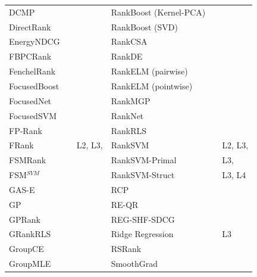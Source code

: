 \documentclass{sig-alternate}
\begin{document}
\begin{table}[!hpt]
{\begin{tabular}{lll|lll}
DCMP & \cite{Renjifo2012}  & \cite{Renjifo2012}  & RankBoost (Kernel-PCA) & \cite{Duh2008} & \cite{Duh2008, Sato2013} \\
DirectRank & \cite{Tan2013} & \cite{Tan2013} & RankBoost (SVD) & \cite{Lin2009} & \cite{Lin2009} \\
EnergyNDCG & \cite{Freno2011} & \cite{Freno2011} & RankCSA & \cite{He2010} & \cite{He2010} \\
FBPCRank & \cite{Lai2011} & \cite{Lai2011} & RankDE & \cite{Bollegala2011} & \cite{Sato2013} \\
FenchelRank & \cite{Lai2013} & \cite{Lai2013, Lai2013b, Laporte2013} & RankELM (pairwise) & \cite{Zong2013} & \cite{Zong2013} \\ 
FocusedBoost & \cite{Niu2012} & \cite{Niu2012} &  RankELM (pointwise) & \cite{Zong2013} & \cite{Zong2013} \\ 
FocusedNet & \cite{Niu2012} & \cite{Niu2012} & RankMGP & \cite{Lin2012} & \cite{Lin2012} \\ 
FocusedSVM & \cite{Niu2012} & \cite{Niu2012} & RankNet & \cite{Burges2005} & \cite{Busa-Fekete2013, Papini2012, Niu2012} \\ 
FP-Rank & \cite{Song2013} & \cite{Song2013} & RankRLS & \cite{Pahikkala2009} & \cite{Pahikkala2010} \\ 
FRank & \cite{Tsai2007} & L2, L3, \cite{Wang2012} & RankSVM & \cite{Herbrich1999, Joachims2002} & L2, L3, \cite{Busa-Fekete2013, Freno2011, He2010, Alcantara2010, Papini2012} \\ 
FSMRank & \cite{Lai2013c} & \cite{Lai2013c,Laporte2013} & RankSVM-Primal &  & L3, \cite{Lai2011} \\ 
FSM$^{SVM}$ & \cite{Lai2013c} & \cite{Lai2013c} & RankSVM-Struct &  & L3, L4 \\
GAS-E & \cite{Geng2007} & \cite{Lai2013c} & RCP & \cite{Elsas2008} & \cite{Elsas2008} \\ 
GP & \cite{DeAlmeida2007} & \cite{Alcantara2010} & RE-QR & \cite{Veloso2010} & \cite{Veloso2010} \\
GPRank & \cite{Silva2009} & \cite{Torkestani2012} & REG-SHF-SDCG & \cite{Wu2009} & \cite{Wu2009} \\  
GRankRLS & \cite{Pahikkala2010} & \cite{Pahikkala2010} & Ridge Regression & \cite{Cossock2006} & L3 \\
GroupCE & \cite{Lin2011} & \cite{Lin2011} & RSRank & \cite{Sun2009} & \cite{Lai2013} \\ 
GroupMLE & \cite{Lin2010} & \cite{Lin2011} & SmoothGrad & \cite{Le2007} & \cite{Tan2013} \\ 

\end{tabular}}
\end{table}
\end{document}
